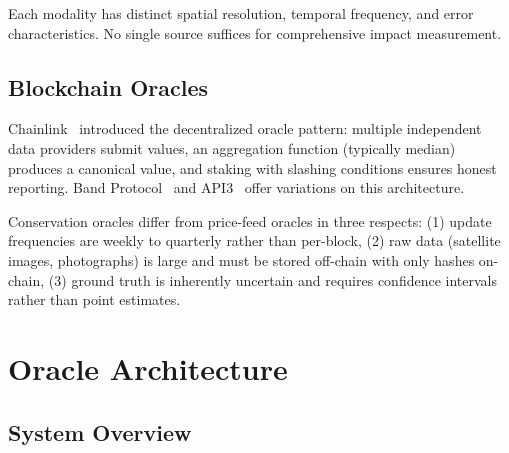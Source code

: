 \documentclass[11pt,letterpaper]{article}
\begin{document}
Each modality has distinct spatial resolution, temporal frequency, and error characteristics. No single source suffices for comprehensive impact measurement.

\subsection{Blockchain Oracles}

Chainlink~\cite{chainlink2023} introduced the decentralized oracle pattern: multiple independent data providers submit values, an aggregation function (typically median) produces a canonical value, and staking with slashing conditions ensures honest reporting. Band Protocol~\cite{band2020} and API3~\cite{api3_2023} offer variations on this architecture.

Conservation oracles differ from price-feed oracles in three respects: (1) update frequencies are weekly to quarterly rather than per-block, (2) raw data (satellite images, photographs) is large and must be stored off-chain with only hashes on-chain, (3) ground truth is inherently uncertain and requires confidence intervals rather than point estimates.

\section{Oracle Architecture}

\subsection{System Overview}
\end{document}
